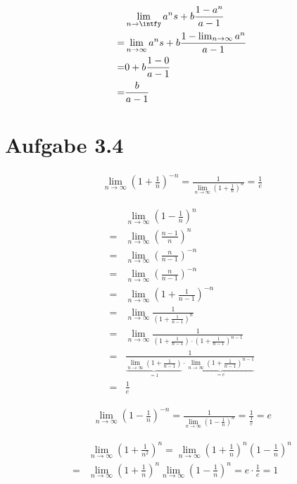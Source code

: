 \documentclass[a4paper,german,12pt,smallheadings]{scrartcl}
\begin{document}
\begin{align*}
  &\lim_{n \to \intfy} a^ns + b \frac{1-a^n}{a-1} \\
  = & \lim_{n \to \infty} a^ns + b \frac{1-\lim_{n \to \infty} a^n}{a-1} \\
  = & 0 + b \frac{1-0}{a-1} \\
  = & \frac{b}{a-1}
\end{align*}

\section*{Aufgabe 3.4}

\begin{align*}
  \lim_{n \to \infty} \left(1+ \frac{1}{n}\right)^{-n} = \frac{1}{\lim_{n \to \infty} \left(1+ \frac{1}{n}\right)^{n}} = \frac{1}{e}
\end{align*}

\begin{align*}
  &\lim_{n \to \infty} \left(1-\frac{1}{n}\right)^n \\
  = &\lim_{n \to \infty} \left(\frac{n-1}{n}\right)^n \\
  = &\lim_{n \to \infty} \left(\frac{n}{n-1}\right)^{-n} \\
  = &\lim_{n \to \infty} \left(\frac{n}{n-1}\right)^{-n} \\
  = &\lim_{n \to \infty} \left(1+\frac{1}{n-1}\right)^{-n} \\
  = &\lim_{n \to \infty} \frac{1}{\left(1+\frac{1}{n-1}\right)^{n}} \\
  = &\lim_{n \to \infty} \frac{1}{\left(1+\frac{1}{n-1}\right) \cdot \left(1+\frac{1}{n-1}\right)^{n-1}} \\
  = &\frac{1}{\underbrace{\lim_{n \to \infty}\left(1+\frac{1}{n-1}\right)}_{= 1} \cdot \underbrace{\lim_{n \to \infty} \left(1+\frac{1}{n-1}\right)^{n-1}}_{= e}} \\
  = &\frac{1}{e}
\end{align*}

\begin{align*}
  \lim_{n \to \infty} \left(1- \frac{1}{n}\right)^{-n} = \frac{1}{\lim_{n \to \infty} \left(1- \frac{1}{n}\right)^{n}} = \frac{1}{\frac{1}{e}} = e
\end{align*}

\begin{align*}
  &\lim_{n \to \infty} \left(1 + \frac{1}{n^2}\right)^{n} = \lim_{n \to \infty} \left(1+\frac{1}{n}\right)^n \left(1-\frac{1}{n}\right)^n \\
  = &\lim_{n \to \infty} \left(1+\frac{1}{n}\right)^n \lim_{n \to \infty} \left(1-\frac{1}{n}\right)^n = e \cdot \frac{1}{e} = 1
\end{align*}
\end{document}
